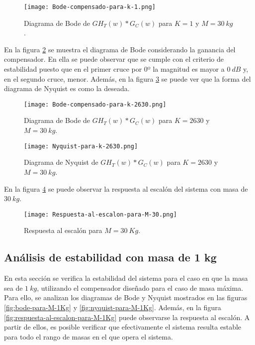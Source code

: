 \begin{figure}[H]
	\centering
	\texttt{[image: Bode-compensado-para-k-1.png]}
	\caption{Diagrama de Bode de $GH_T(w)*G_C(w)$ para $K=1$ y $M=30\:kg$.}
	\label{fig:bode-compensado-para-k-1}
\end{figure}


\noindent En la figura \ref{fig:bode-compensado-para-k-2630} se muestra el diagrama de Bode considerando la ganancia del compensador. En ella se puede observar que se  cumple con el criterio de estabilidad puesto que en el primer cruce por 0º la magnitud es mayor a $0\:dB$ y, en el segundo cruce, menor. Adem\'{a}s, en la figura \ref{fig:nyquist-para-k-2630} se puede ver que la forma del diagrama de Nyquist es como la deseada.

\begin{figure}[H]
	\centering
	\texttt{[image: Bode-compensado-para-k-2630.png]}
	\caption{Diagrama de Bode de $GH_T(w)*G_C(w)$ para $K=2630$ y $M=30\:kg$.}
	\label{fig:bode-compensado-para-k-2630}
\end{figure}

\begin{figure}[H]
	\centering
	\texttt{[image: Nyquist-para-k-2630.png]}
	\caption{Diagrama de Nyquist de $GH_T(w)*G_C(w)$ para $K=2630$ y $M=30\:kg$.}
	\label{fig:nyquist-para-k-2630}
\end{figure}

\noindent En la figura \ref{fig:respuesta-al-escalon-para-M-30} se puede observar la respuesta al escal\'{o}n del sistema con masa de $30\:kg$.


\begin{figure}[H]
	\centering
	\texttt{[image: Respuesta-al-escalon-para-M-30.png]}
	\caption{Respuesta al escalón para $M=30\:Kg$.}
	\label{fig:respuesta-al-escalon-para-M-30}
\end{figure}

\subsection{Análisis de estabilidad con masa de 1 kg}

\noindent En esta secci\'{o}n se verifica la estabilidad del sistema  para el caso en que la masa sea de $1\:kg$, utilizando el compensador dise\~{n}ado para el caso de masa m\'{a}xima. Para ello, se analizan los diagramas de Bode y Nyquist mostrados en las figuras \ref{fig:bode-para-M-1Kg} y \ref{fig:nyquist-para-M-1Kg}. Adem\'{a}s, en la figura \ref{fig:respuesta-al-escalon-para-M-1Kg} puede observarse la respuesta al escal\'{o}n. A partir de ellos, es posible verificar que efectivamente el sistema resulta estable para todo el rango de masas en el que opera el sistema. 


